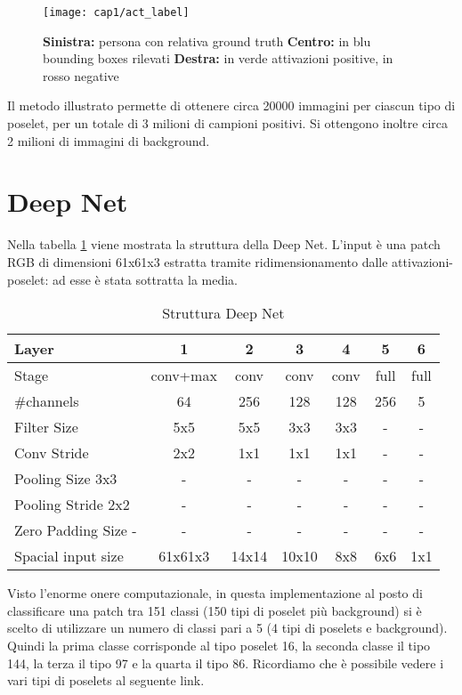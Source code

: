\begin{figure}[h!b]
\centering
\texttt{[image: cap1/act\_label]}
\caption{\textbf{Sinistra:} persona con relativa ground truth \textbf{Centro:} in blu bounding boxes rilevati \textbf{Destra:} in verde attivazioni positive, in rosso negative }
\label{}
\end{figure}

Il metodo illustrato permette di ottenere circa 20000 immagini per ciascun tipo di poselet, per un totale di 3 milioni di campioni positivi. Si ottengono inoltre circa 2 milioni di immagini di background.

\section{Deep Net}
Nella tabella \ref{table-deepnet} viene mostrata la struttura della Deep Net. L'input è una patch RGB di dimensioni 61x61x3 estratta tramite ridimensionamento dalle attivazioni-poselet: ad esse è stata sottratta la media. 

\begin{table}[h!b]
\centering
\begin{tabular}{|l | c | c | c | c | c | c|}
 \hline
 Layer & 1 & 2 & 3 & 4 & 5 & 6 \\ \hline
 Stage & conv+max & conv & conv & conv & full & full \\ \hline
 \#channels & 64 & 256 & 128 & 128 & 256 & 5 \\ \hline
 Filter Size & 5x5 & 5x5 & 3x3 & 3x3 & - & - \\ \hline
 Conv Stride & 2x2 & 1x1 & 1x1 & 1x1 & - & - \\ \hline
 Pooling Size 3x3 & - & -& -& -& - & -\\ \hline
 Pooling Stride 2x2 & - & -& -& -& - & - \\ \hline
 Zero Padding Size - & - & -& -& -& - & - \\ \hline 
 Spacial input size & 61x61x3 & 14x14 & 10x10 & 8x8 & 6x6 & 1x1 \\
 \hline
\end{tabular}
\caption{Struttura Deep Net}
\label{table-deepnet}
\end{table}

Visto l'enorme onere computazionale, in questa implementazione al posto di classificare una patch tra 151 classi (150 tipi di poselet più background) si è scelto di utilizzare un numero di classi pari a 5 (4 tipi di poselets e background). Quindi la prima classe corrisponde al tipo poselet 16, la seconda classe il tipo 144, la terza il tipo 97 e la quarta il tipo 86. Ricordiamo che è possibile vedere i vari tipi di poselets al seguente link\cite{poselets-image}.

